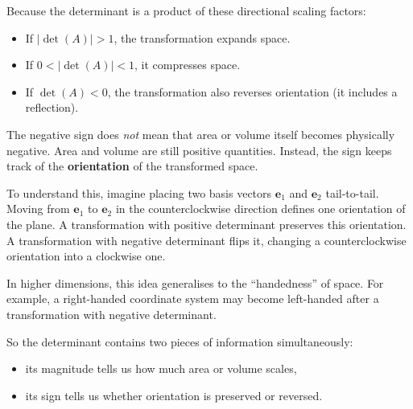 \documentclass[11pt,openany]{book}
\theoremstyle{definition}
\begin{document}
Because the determinant is a product of these directional scaling factors:

\begin{itemize}
  \item If $|\det(A)| > 1$, the transformation expands space.
  \item If $0 < |\det(A)| < 1$, it compresses space.
  \item If $\det(A) < 0$, the transformation also reverses orientation (it includes a reflection).
\end{itemize}

\medskip

The negative sign does \textit{not} mean that area or volume itself becomes physically 
negative. Area and volume are still positive quantities. Instead, the sign keeps track 
of the \textbf{orientation} of the transformed space.

\medskip

To understand this, imagine placing two basis vectors $\mathbf{e}_1$ and $\mathbf{e}_2$ 
tail-to-tail. Moving from $\mathbf{e}_1$ to $\mathbf{e}_2$ in the counterclockwise direction 
defines one orientation of the plane. A transformation with positive determinant preserves 
this orientation. A transformation with negative determinant flips it, changing a 
counterclockwise orientation into a clockwise one.

\medskip

In higher dimensions, this idea generalises to the ``handedness'' of space. For example, 
a right-handed coordinate system may become left-handed after a transformation with 
negative determinant.

\medskip

So the determinant contains two pieces of information simultaneously:

\begin{itemize}
  \item its magnitude tells us how much area or volume scales,
  \item its sign tells us whether orientation is preserved or reversed.
\end{itemize}
\end{document}
